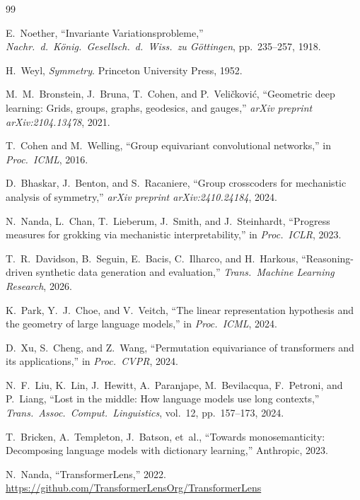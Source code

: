\documentclass[10pt, letterpaper]{article}
\begin{document}
\begin{thebibliography}{99}

E.~Noether, ``Invariante Variationsprobleme,'' \textit{Nachr.\ d.\ K\"onig.\ Gesellsch.\ d.\ Wiss.\ zu G\"ottingen}, pp.~235--257, 1918.

H.~Weyl, \textit{Symmetry}. Princeton University Press, 1952.

M.~M.~Bronstein, J.~Bruna, T.~Cohen, and P.~Veli\v{c}kovi\'{c}, ``Geometric deep learning: Grids, groups, graphs, geodesics, and gauges,'' \textit{arXiv preprint arXiv:2104.13478}, 2021.

T.~Cohen and M.~Welling, ``Group equivariant convolutional networks,'' in \textit{Proc.\ ICML}, 2016.

D.~Bhaskar, J.~Benton, and S.~Racaniere, ``Group crosscoders for mechanistic analysis of symmetry,'' \textit{arXiv preprint arXiv:2410.24184}, 2024.

N.~Nanda, L.~Chan, T.~Lieberum, J.~Smith, and J.~Steinhardt, ``Progress measures for grokking via mechanistic interpretability,'' in \textit{Proc.\ ICLR}, 2023.

T.~R.~Davidson, B.~Seguin, E.~Bacis, C.~Ilharco, and H.~Harkous, ``Reasoning-driven synthetic data generation and evaluation,'' \textit{Trans.\ Machine Learning Research}, 2026.

K.~Park, Y.~J.~Choe, and V.~Veitch, ``The linear representation hypothesis and the geometry of large language models,'' in \textit{Proc.\ ICML}, 2024.

D.~Xu, S.~Cheng, and Z.~Wang, ``Permutation equivariance of transformers and its applications,'' in \textit{Proc.\ CVPR}, 2024.

N.~F.~Liu, K.~Lin, J.~Hewitt, A.~Paranjape, M.~Bevilacqua, F.~Petroni, and P.~Liang, ``Lost in the middle: How language models use long contexts,'' \textit{Trans.\ Assoc.\ Comput.\ Linguistics}, vol.~12, pp.~157--173, 2024.

T.~Bricken, A.~Templeton, J.~Batson, et~al., ``Towards monosemanticity: Decomposing language models with dictionary learning,'' Anthropic, 2023.

N.~Nanda, ``TransformerLens,'' 2022. \url{https://github.com/TransformerLensOrg/TransformerLens}


\end{thebibliography}
\end{document}
